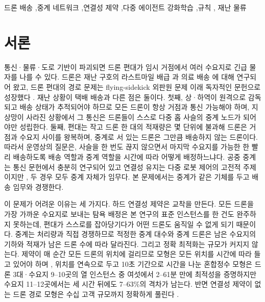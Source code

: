 \documentclass[final,5p,times,twocolumn]{elsarticle}
\begin{document}
\begin{frontmatter}
\begin{keyword}
드론 배송 \sep 중계 네트워크 \sep 연결성 제약 \sep 다중 에이전트 강화학습 \sep 규칙 \sep
재난 물류
\end{keyword}

\end{frontmatter}

\section{서론}
\label{sec:intro}

통신·물류·도로 기반이 파괴되면 드론 편대가 임시 거점에서 여러 수요지로 긴급 물자를 나를 수
있다. 드론은 재난 구호의 라스트마일 배급 \cite{chowdhury2017,rabta2018,erdelj2017}과 의료 배송
\cite{kim2017,ghelichi2021}에 대해 연구되어 왔고, 드론 편대의 경로 문제는 flying-sidekick 외판원
문제 이래 독자적인 문헌으로 성장했다 \cite{murray2015,otto2018,macrina2020,chung2020}. 재난 상황이
택배 배송과 다른 점은 둘이다. 첫째, 상·하역이 원격으로 감독되고 배송 상태가 추적되어야 하므로 모든
드론이 항상 거점과 통신 가능해야 하며, 지상망이 사라진 상황에서 그 통신은 드론들이 스스로 다중 홉
사슬의 중계 노드가 되어야만 성립한다. 둘째, 편대는 작고 드론 한 대의 적재량은 몇 단위에 불과해
드론은 거점과 수요지 사이를 왕복하며, 중계로 서 있는 드론은 그만큼 배송하지 않는 드론이다. 따라서
운영상의 질문은, 사슬을 한 번도 끊지 않으면서 마지막 수요지를 가능한 한 빨리 배송하도록 배송
역할과 중계 역할을 시간에 따라 어떻게 배정하느냐다. 공중 중계는 통신 문헌에서 충분히 연구되어
있고 \cite{zeng2016,mozaffari2019,burdakov2010} 연결성 유지는 다중 로봇 제어의 고전적 주제이지만
\cite{zavlanos2011,dixon2009}, 두 경우 모두 중계 자체가 임무다. 본 문제에서는 중계가 같은
기체를 두고 배송 임무와 경쟁한다.

이 문제가 어려운 이유는 세 가지다. 하드 연결성 제약은 교착을 만든다. 모든 드론을 가장 가까운
수요지로 보내는 탐욕 배정은 본 연구의 표준 인스턴스를 한 건도 완주하지 못하는데, 편대가 스스로를
잡아당기다가 어떤 드론도 움직일 수 없게 되기 때문이다. 중계는 처리량과 직접 경쟁하므로 적정한 중계
대수와 중계 드론은 남은 수요지의 기하와 적재가 남은 드론 수에 따라 달라진다. 그리고 정확 최적화는
규모가 커지지 않는다. 제약이 매 순간 모든 드론의 위치에 걸리므로 모형은 모든 위치를 시간에 따라
들고 있어야 하며 \cite{ford1962,skutella2009}, 위치를 연속으로 두고 10초 기간으로 시간을 나눈
혼합정수 모형은 드론 3대·수요지 9--10곳의 열 인스턴스 중 여섯에서 2--61분 만에 최적성을 증명하지만
수요지 11--12곳에서는 세 시간 뒤에도 7--63\%의 격차가 남는다. 반면 연결성 제약이 없는 드론 경로 모형은
수십 고객 규모까지 정확하게 풀린다 \cite{roberti2021}.
\end{document}
